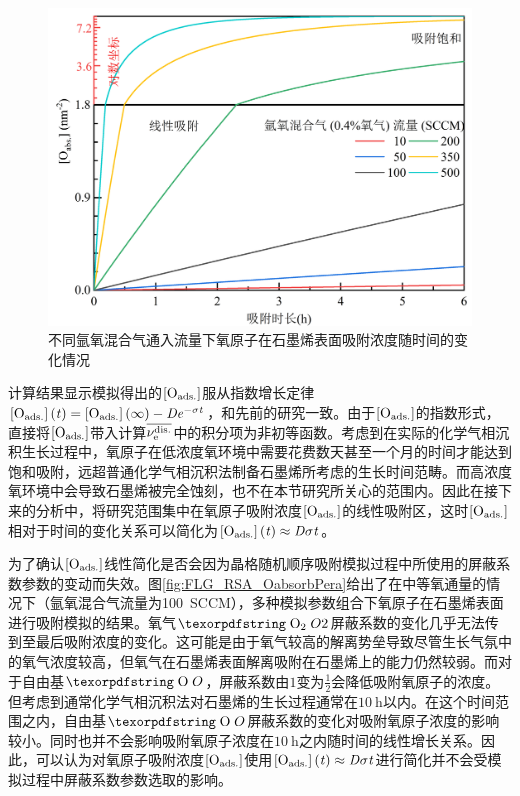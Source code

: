 \begin{figure}[htb]
    \includegraphics{pic/FLG_RSA_Oadsorb.png}
    \captionsetup{width=\textwidth}
    \caption{不同氩氧混合气通入流量下氧原子在石墨烯表面吸附浓度随时间的变化情况}
    \label{fig:FLG_RSA_Oadsorb}
\end{figure}

计算结果显示模拟得出的$\rm{\left[O_{ads.}\right]} \it$服从指数增长定律$\rm{\left[O_{ads.}\right]} \it\left(\it t\right)=\rm{\left[O_{ads.}\right]} \it\left(\it \infty \right)-\it De^{\it -\sigma t}$，和先前的研究一致。由于$\rm{\left[O_{ads.}\right]} \it$的指数形式，直接将$\rm{\left[O_{ads.}\right]} \it$带入计算$\overline{\it \nu_{\rm e}^{\rm dis.} \it}$中的积分项为非初等函数。考虑到在实际的化学气相沉积生长过程中，氧原子在低浓度氧环境中需要花费数天甚至一个月的时间才能达到饱和吸附，远超普通化学气相沉积法制备石墨烯所考虑的生长时间范畴。而高浓度氧环境中会导致石墨烯被完全蚀刻，也不在本节研究所关心的范围内。因此在接下来的分析中，将研究范围集中在氧原子吸附浓度$\rm{\left[O_{ads.}\right]} \it$的线性吸附区，这时$\rm{\left[O_{ads.}\right]} \it$相对于时间的变化关系可以简化为$\rm{\left[O_{ads.}\right]} \it\left(\it t\right)\approx \it D \sigma t$。

为了确认$\rm{\left[O_{ads.}\right]} \it$线性简化是否会因为晶格随机顺序吸附模拟过程中所使用的屏蔽系数参数的变动而失效。图\ref{fig:FLG_RSA_OabsorbPera}给出了在中等氧通量的情况下（氩氧混合气流量为\SI{100}{SCCM}），多种模拟参数组合下氧原子在石墨烯表面进行吸附模拟的结果。氧气$\cemb{O2}$屏蔽系数的变化几乎无法传到至最后吸附浓度的变化。这可能是由于氧气较高的解离势垒导致尽管生长气氛中的氧气浓度较高，但氧气在石墨烯表面解离吸附在石墨烯上的能力仍然较弱。而对于自由基$\cemb{O}$，屏蔽系数由$1$变为$\frac{1}{2}$会降低吸附氧原子的浓度。但考虑到通常化学气相沉积法对石墨烯的生长过程通常在$\SI{10}{\hour}$以内。在这个时间范围之内，自由基$\cemb{O}$屏蔽系数的变化对吸附氧原子浓度的影响较小。同时也并不会影响吸附氧原子浓度在$\SI{10}{\hour}$之内随时间的线性增长关系。因此，可以认为对氧原子吸附浓度$\rm{\left[O_{ads.}\right]} \it$使用$\rm{\left[O_{ads.}\right]} \it\left(\it t\right)\approx \it D \sigma t$进行简化并不会受模拟过程中屏蔽系数参数选取的影响。

